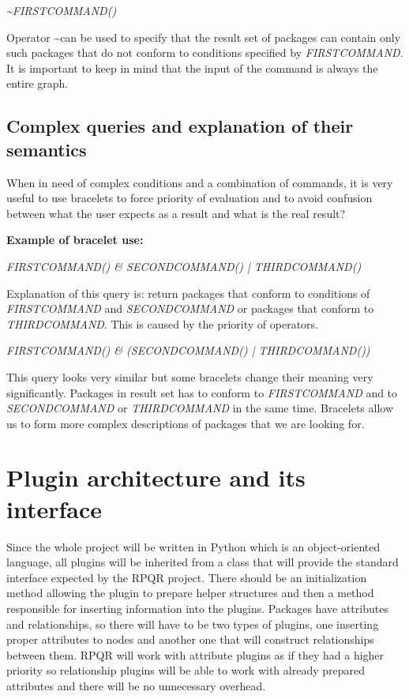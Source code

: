\textit{\textasciitilde FIRSTCOMMAND()}

Operator \textasciitilde can be used to specify that the result set of packages can contain only such
packages that do not conform to conditions specified by \textit{FIRSTCOMMAND}. It is important
to keep in mind that the input of the command is always the entire graph.

\subsection*{Complex queries and explanation of their semantics}

When in need of complex conditions and a combination of commands, it is very useful to use bracelets
to force priority of evaluation and to avoid confusion between what the user expects as a result and
what is the real result?

\textbf{Example of bracelet use:}

\textit{FIRSTCOMMAND() \& SECONDCOMMAND() | THIRDCOMMAND()}

Explanation of this query is: return packages that conform to conditions of \textit{FIRSTCOMMAND}
and \textit{SECONDCOMMAND} or packages that conform to \textit{THIRDCOMMAND}. This is caused
by the priority of operators.

\textit{FIRSTCOMMAND() \& (SECONDCOMMAND() | THIRDCOMMAND())}

This query looks very similar but some bracelets change their meaning very significantly.
Packages in result set has to conform to \textit{FIRSTCOMMAND} and to \textit{SECONDCOMMAND} or 
\textit{THIRDCOMMAND} in the same time. Bracelets allow us to form more complex descriptions of
packages that we are looking for.

\section{Plugin architecture and its interface}

Since the whole project will be written in Python which is an object-oriented language, all plugins
will be inherited from a class that will provide the standard interface expected by the RPQR project. There
should be an initialization method allowing the plugin to prepare helper structures and then a method responsible
for inserting information into the plugins. Packages have attributes and relationships, so there 
will have to be two types of plugins, one inserting proper attributes to nodes and another one that
will construct relationships between them. RPQR will work with attribute plugins as if they had
a higher priority so relationship plugins will be able to work with already prepared attributes and
there will be no unnecessary overhead.

